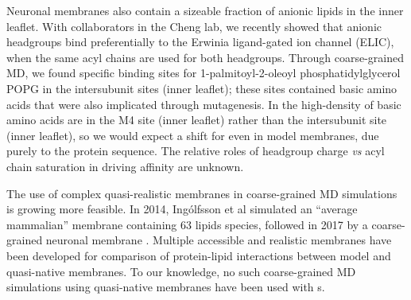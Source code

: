 Neuronal membranes also contain a sizeable fraction of anionic lipids in the inner leaflet\cite{Isolated1969,Breckenridge1973,Taguchi2010}. With collaborators in the Cheng lab, we recently\cite{Tong2019} showed that anionic headgroups bind preferentially to the \plgic{} Erwinia ligand-gated ion channel (ELIC), when the same acyl chains are used for both headgroups.  Through coarse-grained MD, we found specific binding sites for 1-palmitoyl-2-oleoyl phosphatidylglycerol POPG in the intersubunit sites (inner leaflet); these sites contained basic amino acids that were also implicated through mutagenesis\cite{Tong2019}.  In \nachr{} the high-density of basic amino acids are in the M4 site (inner leaflet) rather than the intersubunit site (inner leaflet), so we would expect a shift for \nachr{} even in model membranes, due purely to the protein sequence. %
The relative roles of headgroup charge {\it vs} acyl chain saturation in driving affinity are unknown. %

The use of complex quasi-realistic membranes in coarse-grained MD simulations is growing more feasible. In 2014, Ing{\'o}lfsson et al\cite{Ingolfsson2014} simulated an ``average mammalian'' membrane containing 63 lipids species, followed in 2017 by a coarse-grained neuronal membrane \cite{Ingolfsson2017b}. Multiple accessible and realistic membranes have been developed for comparison of protein-lipid interactions between model and quasi-native membranes\cite{Marrink2019,Wilson2020,Ingolfsson2020,Carpenter2018,Lorent2019}. To our knowledge, no such coarse-grained MD simulations using quasi-native membranes have been used with \plgic s.

